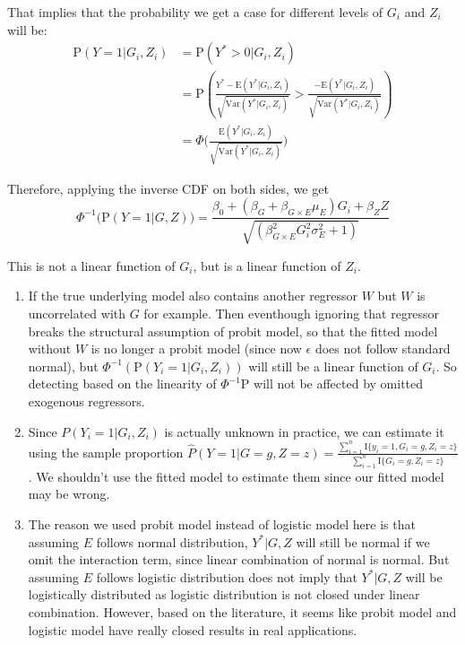 \documentclass[
]{article}
\begin{document}
That implies that the probability we get a case for different levels of
\(G_i\) and \(Z_i\) will be:
\begin{equation}\label{eqn:probitModelWithInteraction_Prob} 
\begin{aligned} 
\text{P}(Y = 1 | G_i, Z_i) &= \text{P}(Y^* > 0| G_i, Z_i) \\ 
                           &= \text{P}(\frac{Y^*  - \text{E}(Y^* |G_i,Z_i)}{\sqrt{\text{Var}(Y^* |G_i,Z_i)}} > \frac{-\text{E}(Y^* |G_i,Z_i)}{\sqrt{\text{Var}(Y^* |G_i,Z_i)}}) \\
                           &= \Phi \bigg( \frac{\text{E}(Y^* |G_i,Z_i)}{\sqrt{\text{Var}(Y^* |G_i,Z_i)}} \bigg)
\end{aligned}
\end{equation}

Therefore, applying the inverse CDF on both sides, we get
\[\Phi^{-1} \bigg(\text{P}(Y = 1 | G, Z) \bigg) = \frac{\beta_0+(\beta_G + \beta_{G\times E} \mu_E)G_i + \beta_Z Z}{\sqrt{(\beta_{G\times E}^2 G_i^2 \sigma_E^2 + 1)}} \]

This is not a linear function of \(G_i\), but is a linear function of
\(Z_i\).

\begin{enumerate}
\item If the true underlying model also contains another regressor $W$ but $W$ is uncorrelated with $G$ for example. Then eventhough ignoring that regressor breaks the structural assumption of probit model, so that the fitted model without $W$ is no longer a probit model (since now $\epsilon$ does not follow standard normal), but $\Phi^{-1}(\text{P}(Y_i = 1|G_i,Z_i))$ will still be a linear function of $G_i$. So detecting based on the linearity of $\Phi^{-1}\text{P}$ will not be affected by omitted exogenous regressors.
\item Since $P(Y_i = 1|G_i,Z_i)$ is actually unknown in practice, we can estimate it using the sample proportion $\hat{P}(Y = 1|G = g,Z = z) = \frac{\sum_{i=1}^{n} \text{I}\{y_i =1,G_{i} = g, Z_{i} = z\}}{\sum_{i=1}^{n}  \text{I}\{G_{i} = g, Z_{i} = z\}}$. We shouldn't use the fitted model to estimate them since our fitted model may be wrong.
\item The reason we used probit model instead of logistic model here is that assuming $E$ follows normal distribution, $Y^*|G,Z$ will still be normal if we omit the interaction term, since linear combination of normal is normal. But assuming $E$ follows logistic distribution does not imply that $Y^*|G,Z$ will be logistically distributed as logistic distribution is not closed under linear combination. However, based on the literature, it seems like probit model and logistic model have really closed results in real applications.
\end{enumerate}
\end{document}
